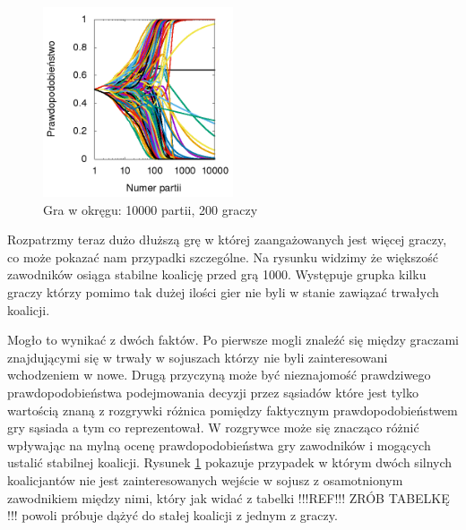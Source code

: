 \begin{figure}
    \centering
    \includegraphics[width=0.5\textwidth]{pict/wyniki/g10000p200}   
    \caption{Gra w okręgu: 10000 partii, 200 graczy}
	\label{fig:niechciani} 
\end{figure}

Rozpatrzmy teraz dużo dłuższą grę w której zaangażowanych jest więcej graczy, co może pokazać nam przypadki szczególne. Na rysunku widzimy że większość zawodników osiąga stabilne koalicję przed grą 1000. Występuje grupka kilku graczy którzy pomimo tak dużej ilości gier nie byli w stanie zawiązać trwałych koalicji.

Mogło to wynikać z dwóch faktów. Po pierwsze mogli znaleźć się między graczami znajdującymi się w trwały w sojuszach którzy nie byli zainteresowani wchodzeniem w nowe. Drugą przyczyną może być nieznajomość prawdziwego prawdopodobieństwa podejmowania decyzji przez sąsiadów które jest tylko wartością znaną z rozgrywki różnica pomiędzy faktycznym prawdopodobieństwem gry sąsiada a tym co reprezentował. W rozgrywce może się znacząco różnić wpływając na mylną ocenę prawdopodobieństwa gry zawodników i mogących ustalić stabilnej koalicji. Rysunek \ref{fig:niechciani} pokazuje przypadek w którym dwóch silnych koalicjantów nie jest zainteresowanych wejście w sojusz z osamotnionym zawodnikiem między nimi, który jak widać z tabelki !!!REF!!! ZRÓB TABELKĘ !!! powoli próbuje dążyć do stałej koalicji z jednym z graczy.

